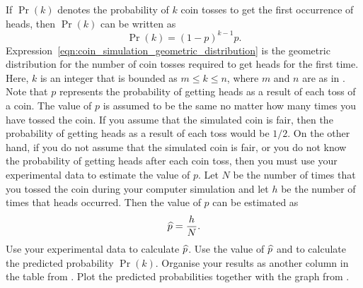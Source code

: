 \documentclass[a4paper,oneside,12pt]{article}
\begin{document}
\begin{problem}
\begin{packedenum}
  \item\label{subprob:coin_simulation_estimate_probability}
    If $\Pr(k)$ denotes the probability of $k$ coin tosses to get the
    first occurrence of heads, then $\Pr(k)$ can be written as
    \begin{equation}
    \label{eqn:coin_simulation_geometric_distribution}
    \Pr(k)
    =
    (1 - p)^{k-1} p.
    \end{equation}
    Expression~\eqref{eqn:coin_simulation_geometric_distribution} is
    the geometric distribution for the number of coin tosses required
    to get heads for the first time.  Here, $k$ is an integer that is
    bounded as $m \leq k \leq n$, where $m$ and $n$ are as
    in .  Note
    that $p$ represents the probability of getting heads as a result
    of each toss of a coin.  The value of $p$ is assumed to be the
    same no matter how many times you have tossed the coin.  If you
    assume that the simulated coin is fair, then the probability of
    getting heads as a result of each toss would be $1 / 2$.  On the
    other hand, if you do not assume that the simulated coin is fair,
    or you do not know the probability of getting heads after each
    coin toss, then you must use your experimental data to estimate
    the value of $p$.  Let $N$ be the number of times that you tossed
    the coin during your computer simulation and let $h$ be the number
    of times that heads occurred.  Then the value of $p$ can be
    estimated as
    \begin{equation}
    \label{eqn:coin_simulation_estimate_p}
    \widehat{p}
    =
    \frac{h}{N}.
    \end{equation}
    Use your experimental data to calculate $\widehat{p}$.  Use the value of
    $\widehat{p}$ and
    to calculate the predicted probability $\Pr(k)$.  Organise your
    results as another column in the table
    from .
    Plot the predicted probabilities together with the graph
    from .


\end{packedenum}
\end{problem}
\end{document}
